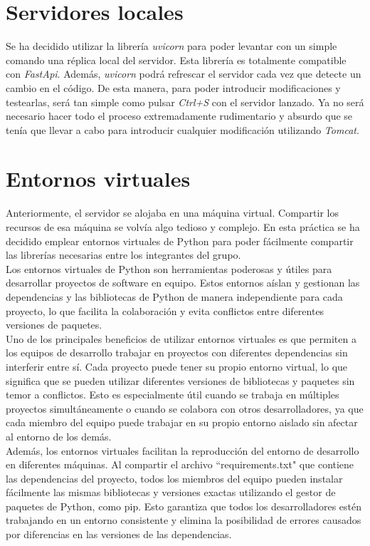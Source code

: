 \documentclass[12pt]{report}
\begin{document}
\section{Servidores locales}
Se ha decidido utilizar la librería \textit{uvicorn} para poder levantar con un simple comando una réplica local del servidor. Esta librería es totalmente compatible con \textit{FastApi}. Además, \textit{uvicorn} podrá refrescar el servidor cada vez que detecte un cambio en el código. De esta manera, para poder introducir modificaciones y testearlas, será tan simple como pulsar \textit{Ctrl+S} con el servidor lanzado. Ya no será necesario hacer todo el proceso extremadamente rudimentario y absurdo que se tenía que llevar a cabo para introducir cualquier modificación utilizando \textit{Tomcat}.
\section{Entornos virtuales}
Anteriormente, el servidor se alojaba en una máquina virtual. Compartir los recursos de esa máquina se volvía algo tedioso y complejo. En esta práctica se ha decidido emplear entornos virtuales de Python para poder fácilmente compartir las librerías necesarias entre los integrantes del grupo.\\

Los entornos virtuales de Python son herramientas poderosas y útiles para desarrollar proyectos de software en equipo. Estos entornos aíslan y gestionan las dependencias y las bibliotecas de Python de manera independiente para cada proyecto, lo que facilita la colaboración y evita conflictos entre diferentes versiones de paquetes.\\

Uno de los principales beneficios de utilizar entornos virtuales es que permiten a los equipos de desarrollo trabajar en proyectos con diferentes dependencias sin interferir entre sí. Cada proyecto puede tener su propio entorno virtual, lo que significa que se pueden utilizar diferentes versiones de bibliotecas y paquetes sin temor a conflictos. Esto es especialmente útil cuando se trabaja en múltiples proyectos simultáneamente o cuando se colabora con otros desarrolladores, ya que cada miembro del equipo puede trabajar en su propio entorno aislado sin afectar al entorno de los demás.\\

Además, los entornos virtuales facilitan la reproducción del entorno de desarrollo en diferentes máquinas. Al compartir el archivo ``requirements.txt" que contiene las dependencias del proyecto, todos los miembros del equipo pueden instalar fácilmente las mismas bibliotecas y versiones exactas utilizando el gestor de paquetes de Python, como pip. Esto garantiza que todos los desarrolladores estén trabajando en un entorno consistente y elimina la posibilidad de errores causados por diferencias en las versiones de las dependencias.\\
\end{document}
